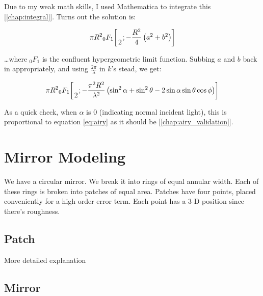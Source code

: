 \documentclass[etd,oneside,senior]{BYUPhys}
\newcommand*\pFqskip{8mu}
\newcommand*\pFq{\begingroup
        \catcode`\,\active
        \def ,{\mskip\pFqskip\relax}%
        \dopFq
}
\def\dopFq#1#2#3#4#5{%
        {}_{#1}F_{#2}\biggl[\genfrac..{0pt}{}{#3}{#4};#5\biggr]%
        \endgroup
}
\begin{document}
Due to my weak math skills, I used Mathematica to integrate this [\ref{chap:integral}]. Turns out the solution is:

\begin{equation}\label{eq:expected_refl}
  \pi R^2 \pFq{0}{1}{}{2}{-\frac{R^2}{4}\left(a^2+b^2\right)}
\end{equation}

\ldots where ${}_0 F_1$ is the confluent hypergeometric limit function. Subbing $a$ and $b$ back in appropriately, and using $\frac{2\pi}{\lambda}$ in $k$'s stead, we get:

\begin{equation}
  \pi R^2 \pFq{0}{1}{}{2}{-\frac{\pi^2 R^2}{\lambda^2}\left(\sin^2\alpha+\sin^2\theta-2\sin\alpha\sin\theta\cos\phi\right)}
\end{equation}

As a quick check, when $\alpha$ is 0 (indicating normal incident light), this is proportional to equation \ref{eq:airy} as it should be [\ref{chap:airy_validation}].







\section{Mirror Modeling} \label{section:mirror_modeling}

We have a circular mirror. We break it into rings of equal annular width. Each of these rings is broken into patches of equal area. Patches have four points, placed conveniently for a high order error term. Each point has a 3-D position since there's roughness.

\subsection{Patch} \label{sec:patch}

More detailed explanation

\subsection{Mirror} \label{sec:mirror}
\end{document}

